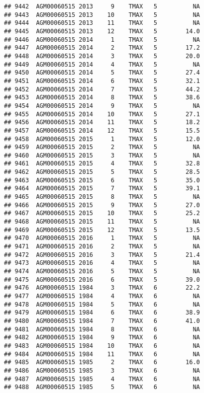 \documentclass{article}\usepackage[]{graphicx}\usepackage[]{color}
\makeatletter
\newenvironment{kframe}{%
 \def\at@end@of@kframe{}%
 \ifinner\ifhmode%
  \def\at@end@of@kframe{\end{minipage}}%
  \begin{minipage}{\columnwidth}%
 \fi\fi%
 \def\FrameCommand##1{\hskip\@totalleftmargin \hskip-\fboxsep
 \colorbox{shadecolor}{##1}\hskip-\fboxsep
     \hskip-\linewidth \hskip-\@totalleftmargin \hskip\columnwidth}%
 \MakeFramed {\advance\hsize-\width
   \@totalleftmargin\z@ \linewidth\hsize
   \@setminipage}}%
 {\par\unskip\endMakeFramed%
 \at@end@of@kframe}
\newenvironment{knitrout}{}{} %
\makeatother
\begin{document}
\begin{knitrout}
\begin{kframe}
\begin{verbatim}
## 9442  AGM00060515 2013     9    TMAX   5          NA
## 9443  AGM00060515 2013    10    TMAX   5          NA
## 9444  AGM00060515 2013    11    TMAX   5          NA
## 9445  AGM00060515 2013    12    TMAX   5        14.0
## 9446  AGM00060515 2014     1    TMAX   5          NA
## 9447  AGM00060515 2014     2    TMAX   5        17.2
## 9448  AGM00060515 2014     3    TMAX   5        20.0
## 9449  AGM00060515 2014     4    TMAX   5          NA
## 9450  AGM00060515 2014     5    TMAX   5        27.4
## 9451  AGM00060515 2014     6    TMAX   5        32.1
## 9452  AGM00060515 2014     7    TMAX   5        44.2
## 9453  AGM00060515 2014     8    TMAX   5        38.6
## 9454  AGM00060515 2014     9    TMAX   5          NA
## 9455  AGM00060515 2014    10    TMAX   5        27.1
## 9456  AGM00060515 2014    11    TMAX   5        18.2
## 9457  AGM00060515 2014    12    TMAX   5        15.5
## 9458  AGM00060515 2015     1    TMAX   5        12.0
## 9459  AGM00060515 2015     2    TMAX   5          NA
## 9460  AGM00060515 2015     3    TMAX   5          NA
## 9461  AGM00060515 2015     4    TMAX   5        32.8
## 9462  AGM00060515 2015     5    TMAX   5        28.5
## 9463  AGM00060515 2015     6    TMAX   5        35.0
## 9464  AGM00060515 2015     7    TMAX   5        39.1
## 9465  AGM00060515 2015     8    TMAX   5          NA
## 9466  AGM00060515 2015     9    TMAX   5        27.0
## 9467  AGM00060515 2015    10    TMAX   5        25.2
## 9468  AGM00060515 2015    11    TMAX   5          NA
## 9469  AGM00060515 2015    12    TMAX   5        13.5
## 9470  AGM00060515 2016     1    TMAX   5          NA
## 9471  AGM00060515 2016     2    TMAX   5          NA
## 9472  AGM00060515 2016     3    TMAX   5        21.4
## 9473  AGM00060515 2016     4    TMAX   5          NA
## 9474  AGM00060515 2016     5    TMAX   5          NA
## 9475  AGM00060515 2016     6    TMAX   5        39.0
## 9476  AGM00060515 1984     3    TMAX   6        22.2
## 9477  AGM00060515 1984     4    TMAX   6          NA
## 9478  AGM00060515 1984     5    TMAX   6          NA
## 9479  AGM00060515 1984     6    TMAX   6        38.9
## 9480  AGM00060515 1984     7    TMAX   6        41.0
## 9481  AGM00060515 1984     8    TMAX   6          NA
## 9482  AGM00060515 1984     9    TMAX   6          NA
## 9483  AGM00060515 1984    10    TMAX   6          NA
## 9484  AGM00060515 1984    11    TMAX   6          NA
## 9485  AGM00060515 1985     2    TMAX   6        16.0
## 9486  AGM00060515 1985     3    TMAX   6          NA
## 9487  AGM00060515 1985     4    TMAX   6          NA
## 9488  AGM00060515 1985     5    TMAX   6          NA

\end{verbatim}
\end{kframe}
\end{knitrout}
\end{document}
